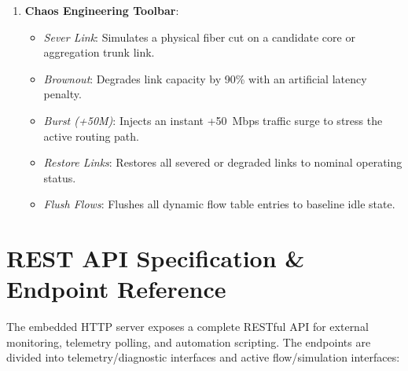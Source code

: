 \documentclass[12pt,a4paper,oneside]{report}
\begin{document}
\begin{enumerate}
    \item \textbf{Chaos Engineering Toolbar}:
    \begin{itemize}
        \item \textit{Sever Link}: Simulates a physical fiber cut on a candidate core or aggregation trunk link.
        \item \textit{Brownout}: Degrades link capacity by 90\% with an artificial latency penalty.
        \item \textit{Burst (+50M)}: Injects an instant +50~Mbps traffic surge to stress the active routing path.
        \item \textit{Restore Links}: Restores all severed or degraded links to nominal operating status.
        \item \textit{Flush Flows}: Flushes all dynamic flow table entries to baseline idle state.
    \end{itemize}
\end{enumerate}

\section{REST API Specification \& Endpoint Reference}
The embedded HTTP server exposes a complete RESTful API for external monitoring, telemetry polling, and automation scripting. The endpoints are divided into telemetry/diagnostic interfaces and active flow/simulation interfaces:
\end{document}
